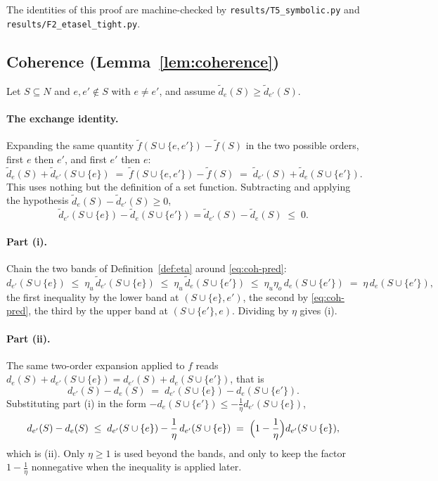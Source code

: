 The identities of this proof are machine-checked by
\texttt{results/T5\_symbolic.py} and \texttt{results/F2\_etasel\_tight.py}.

\subsection{Coherence (Lemma~\ref{lem:coherence})}\label{app:coherence}

Let $S\subseteq N$ and $e,e'\notin S$ with $e\ne e'$, and assume
$\tilde d_{e}(S)\ge\tilde d_{e'}(S)$.

\paragraph{The exchange identity.}
Expanding the same quantity $\tilde f(S\cup\{e,e'\})-\tilde f(S)$ in the two
possible orders, first $e$ then $e'$, and first $e'$ then $e$:
\[
  \tilde d_{e}(S)+\tilde d_{e'}(S\cup\{e\})
  \;=\;\tilde f(S\cup\{e,e'\})-\tilde f(S)
  \;=\;\tilde d_{e'}(S)+\tilde d_{e}(S\cup\{e'\}) .
\]
This uses nothing but the definition of a set function.  Subtracting and
applying the hypothesis $\tilde d_{e}(S)-\tilde d_{e'}(S)\ge0$,
\begin{equation}\label{eq:coh-pred}
  \tilde d_{e'}(S\cup\{e\})-\tilde d_{e}(S\cup\{e'\})
  =\tilde d_{e'}(S)-\tilde d_{e}(S)\;\le\;0 .
\end{equation}

\paragraph{Part (i).}
Chain the two bands of Definition~\ref{def:eta} around
\eqref{eq:coh-pred}:
\[
  d_{e'}(S\cup\{e\})\;\le\;\eta_u\,\tilde d_{e'}(S\cup\{e\})
  \;\le\;\eta_u\,\tilde d_{e}(S\cup\{e'\})
  \;\le\;\eta_u\eta_o\,d_{e}(S\cup\{e'\})
  \;=\;\eta\,d_{e}(S\cup\{e'\}),
\]
the first inequality by the lower band at $(S\cup\{e\},e')$, the second by
\eqref{eq:coh-pred}, the third by the upper band at $(S\cup\{e'\},e)$.
Dividing by $\eta$ gives (i).

\paragraph{Part (ii).}
The same two-order expansion applied to $f$ reads
$d_{e}(S)+d_{e'}(S\cup\{e\})=d_{e'}(S)+d_{e}(S\cup\{e'\})$, that is
\[
  d_{e'}(S)-d_{e}(S)\;=\;d_{e'}(S\cup\{e\})-d_{e}(S\cup\{e'\}) .
\]
Substituting part (i) in the form
$-d_{e}(S\cup\{e'\})\le-\tfrac1\eta d_{e'}(S\cup\{e\})$,
\[
  d_{e'}(S)-d_{e}(S)\;\le\;d_{e'}(S\cup\{e\})
   -\frac1\eta\,d_{e'}(S\cup\{e\})
  \;=\;\Bigl(1-\frac1\eta\Bigr)d_{e'}(S\cup\{e\}),
\]
which is (ii).  Only $\eta\ge1$ is used beyond the bands, and only to keep the
factor $1-\tfrac1\eta$ nonnegative when the inequality is applied later.

